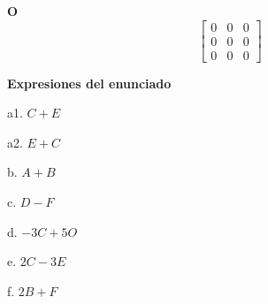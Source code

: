 \documentclass[11pt,a4paper,landscape]{article}
\begin{document}
\par\smallskip \begin{minipage}[t]{.47\linewidth}\centering \textbf{O}\[\begin{bmatrix}0 & 0 & 0\\0 & 0 & 0\\0 & 0 & 0\end{bmatrix}\]\end{minipage}\par\smallskip
\textbf{Expresiones del enunciado}\par
a1. \(C+E\)\par
a2. \(E+C\)\par
b. \(A+B\)\par
c. \(D-F\)\par
d. \(-3C+5O\)\par
e. \(2C-3E\)\par
f. \(2B+F\)\par
\end{document}
